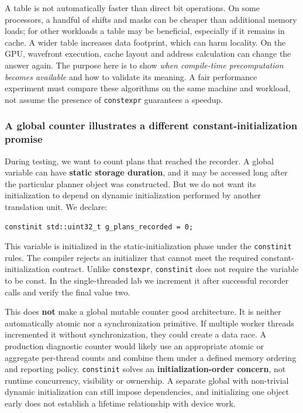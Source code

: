 A table is not automatically faster than direct bit operations. On some processors, a handful of shifts and masks can be cheaper than additional memory loads; for other workloads a table may be beneficial, especially if it remains in cache. A wider table increases data footprint, which can harm locality. On the GPU, wavefront execution, cache layout and address calculation can change the answer again. The purpose here is to show \emph{when compile-time precomputation becomes available} and how to validate its meaning. A fair performance experiment must compare these algorithms on the same machine and workload, not assume the presence of \texttt{constexpr} guarantees a speedup.

\subsubsection{A global counter illustrates a different constant-initialization promise}\label{a-global-counter-illustrates-a-different-constant-initialization-promise}

During testing, we want to count plans that reached the recorder. A global variable can have \textbf{static storage duration}, and it may be accessed long after the particular planner object was constructed. But we do not want its initialization to depend on dynamic initialization performed by another translation unit. We declare:

\begin{verbatim}
constinit std::uint32_t g_plans_recorded = 0;
\end{verbatim}

This variable is initialized in the static-initialization phase under the \texttt{constinit} rules. The compiler rejects an initializer that cannot meet the required constant-initialization contract. Unlike \texttt{constexpr}, \texttt{constinit} does not require the variable to be const. In the single-threaded lab we increment it after successful recorder calls and verify the final value two.

This does \textbf{not} make a global mutable counter good architecture. It is neither automatically atomic nor a synchronization primitive. If multiple worker threads incremented it without synchronization, they could create a data race. A production diagnostic counter would likely use an appropriate atomic or aggregate per-thread counts and combine them under a defined memory ordering and reporting policy. \texttt{constinit} solves an \textbf{initialization-order concern}, not runtime concurrency, visibility or ownership. A separate global with non-trivial dynamic initialization can still impose dependencies, and initializing one object early does not establish a lifetime relationship with device work.

